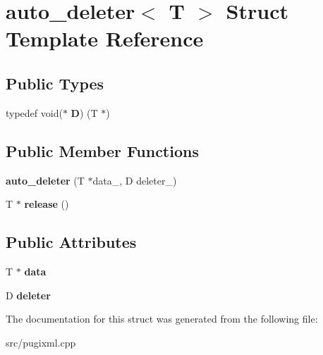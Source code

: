 \hypertarget{structauto__deleter}{}\section{auto\+\_\+deleter$<$ T $>$ Struct Template Reference}
\label{structauto__deleter}
\subsection*{Public Types}
\begin{DoxyCompactItemize}
\item 
\mbox{\label{structauto__deleter_ac6fa4a02518acd2bf40357f207fab0a7}} 
typedef void($\ast$ {\bfseries D}) (T $\ast$)
\end{DoxyCompactItemize}
\subsection*{Public Member Functions}
\begin{DoxyCompactItemize}
\item 
\mbox{\label{structauto__deleter_a2740bca25a73f65af24cc99b07da0370}} 
{\bfseries auto\+\_\+deleter} (T $\ast$data\+\_\+, D deleter\+\_\+)
\item 
\mbox{\label{structauto__deleter_af395b878141c8dd3c66833238be812fe}} 
T $\ast$ {\bfseries release} ()
\end{DoxyCompactItemize}
\subsection*{Public Attributes}
\begin{DoxyCompactItemize}
\item 
\mbox{\label{structauto__deleter_a7c75a965dd01e6ac965b930a75ea3659}} 
T $\ast$ {\bfseries data}
\item 
\mbox{\label{structauto__deleter_a306ab6a225284bd12cae5374fea13fe3}} 
D {\bfseries deleter}
\end{DoxyCompactItemize}


The documentation for this struct was generated from the following file\+:\begin{DoxyCompactItemize}
\item 
src/pugixml.\+cpp\end{DoxyCompactItemize}
